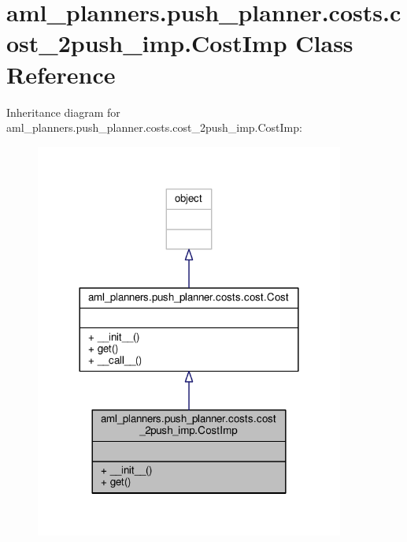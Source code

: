 \hypertarget{classaml__planners_1_1push__planner_1_1costs_1_1cost__2push__imp_1_1_cost_imp}{\section{aml\-\_\-planners.\-push\-\_\-planner.\-costs.\-cost\-\_\-2push\-\_\-imp.\-Cost\-Imp Class Reference}
\label{classaml__planners_1_1push__planner_1_1costs_1_1cost__2push__imp_1_1_cost_imp}
}


Inheritance diagram for aml\-\_\-planners.\-push\-\_\-planner.\-costs.\-cost\-\_\-2push\-\_\-imp.\-Cost\-Imp\-:\nopagebreak
\begin{figure}[H]
\begin{center}
\leavevmode
\includegraphics[width=288pt]{classaml__planners_1_1push__planner_1_1costs_1_1cost__2push__imp_1_1_cost_imp__inherit__graph}
\end{center}
\end{figure}


